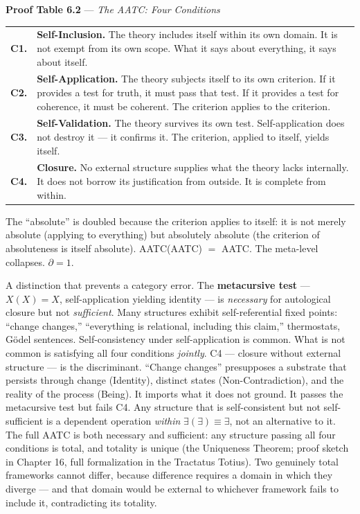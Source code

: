 \documentclass[10pt, openany, oneside]{book}
\renewcommand{\footnotesize}{\fontsize{8.5}{11}\selectfont}
\begin{document}
\vspace{0.5em}

\textbf{Proof Table 6.2} --- \textit{The AATC: Four Conditions}

\vspace{0.5em}

{\footnotesize
\noindent\begin{tabular}{r p{}}
\textbf{C1.} & \textbf{Self-Inclusion.} The theory includes itself within its own domain. It is not exempt from its own scope. What it says about everything, it says about itself. \\[0.3em]
\textbf{C2.} & \textbf{Self-Application.} The theory subjects itself to its own criterion. If it provides a test for truth, it must pass that test. If it provides a test for coherence, it must be coherent. The criterion applies to the criterion. \\[0.3em]
\textbf{C3.} & \textbf{Self-Validation.} The theory survives its own test. Self-application does not destroy it --- it confirms it. The criterion, applied to itself, yields itself. \\[0.3em]
\textbf{C4.} & \textbf{Closure.} No external structure supplies what the theory lacks internally. It does not borrow its justification from outside. It is complete from within. \\[0.3em]
\end{tabular}
}

\vspace{0.8em}

\noindent The ``absolute'' is doubled because the criterion applies to itself: it is not merely absolute (applying to everything) but absolutely absolute (the criterion of absoluteness is itself absolute). AATC(AATC) $=$ AATC. The meta-level collapses. $\partial = 1$.

A distinction that prevents a category error. The \textbf{metacursive test} --- $X(X) = X$, self-application yielding identity --- is \textit{necessary} for autological closure but not \textit{sufficient}. Many structures exhibit self-referential fixed points: ``change changes,'' ``everything is relational, including this claim,'' thermostats, Gödel sentences. Self-consistency under self-application is common. What is not common is satisfying all four conditions \textit{jointly}. C4 --- closure without external structure --- is the discriminant. ``Change changes'' presupposes a substrate that persists through change (Identity), distinct states (Non-Contradiction), and the reality of the process (Being). It imports what it does not ground. It passes the metacursive test but fails C4. Any structure that is self-consistent but not self-sufficient is a dependent operation \textit{within} $\exists(\exists) \equiv \exists$, not an alternative to it. The full AATC is both necessary and sufficient: any structure passing all four conditions is total, and totality is unique (the Uniqueness Theorem; proof sketch in Chapter 16, full formalization in the Tractatus Totius). Two genuinely total frameworks cannot differ, because difference requires a domain in which they diverge --- and that domain would be external to whichever framework fails to include it, contradicting its totality.
\end{document}
